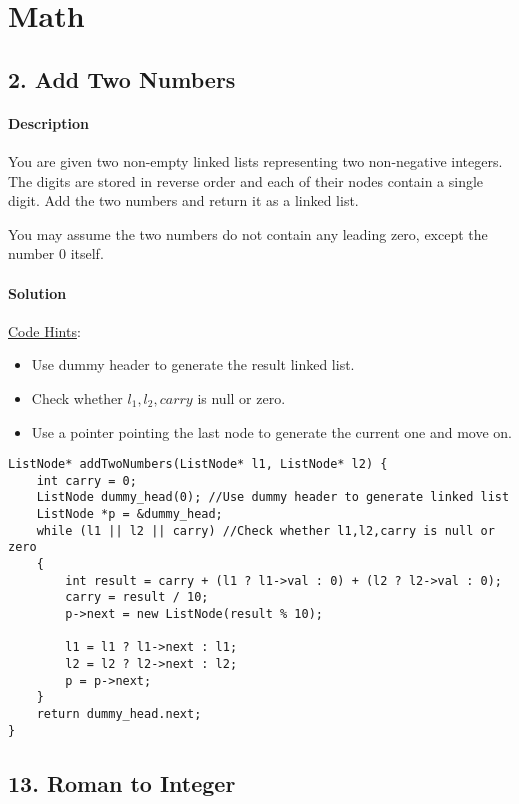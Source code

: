 \section{Math}

\subsection{2. Add Two Numbers}

\paragraph{\color{white} \colorbox{Mahogany}{Description}}

You are given two non-empty linked lists representing two non-negative integers. The digits are stored in reverse order and each of their nodes contain a single digit. Add the two numbers and return it as a linked list.

You may assume the two numbers do not contain any leading zero, except the number 0 itself.

\paragraph{\color{white} \colorbox{OliveGreen}{Solution}}
\underline{Code Hints}:
\begin{itemize}
    \item Use dummy header to generate the result linked list.
    \item Check whether $l_1,l_2,carry$ is null or zero.
    \item Use a pointer pointing the last node to generate the current one and move on.
\end{itemize}

\begin{verbatim}
ListNode* addTwoNumbers(ListNode* l1, ListNode* l2) {
    int carry = 0;
    ListNode dummy_head(0); //Use dummy header to generate linked list
    ListNode *p = &dummy_head;
    while (l1 || l2 || carry) //Check whether l1,l2,carry is null or zero
    {
        int result = carry + (l1 ? l1->val : 0) + (l2 ? l2->val : 0);
        carry = result / 10;
        p->next = new ListNode(result % 10);
        
        l1 = l1 ? l1->next : l1;
        l2 = l2 ? l2->next : l2;
        p = p->next;
    }
    return dummy_head.next;
}
\end{verbatim}

\subsection{13. Roman to Integer}

